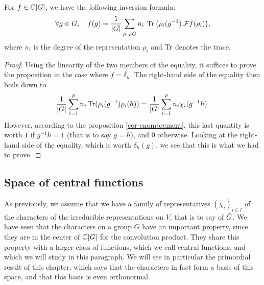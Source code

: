 \begin{thm}
\label{thm-formula-inversion-representation}
 For $ f \in \mathbb{C} [G] $, we have the following inversion formula:
\begin{equation*}
\forall g \in G, \quad f(g) = \frac{1}{|G|} \sum_{\rho_i \in \hat{G}}{n_i \: \operatorname{Tr} \left(\rho_i (g^{-1}) \: \mathcal{F} f(\rho_i) \right)},
\end{equation*}
where $ n_i $ is the degree of the representation $ \rho_i $ and $ \operatorname{Tr} $ denotes the trace.
\end{thm}
\begin{proof}
Using the linearity of the two members of the equality, it suffices to prove the proposition in the case where $ f = \delta_h $. The right-hand side of the equality then boils down to
\begin{equation*}
\frac{1}{|G|} \sum_{i = 1}^p{n_i \operatorname{Tr} (\rho_i (g^{-1}) \rho_i (h))} = \frac{1}{|G|} \sum_{i = 1}^p{n_i \chi_i (g^{-1} h)}.
\end{equation*}
However, according to the proposition \ref{cor-enombrement}, this last quantity is worth $ 1 $ if $ g^{-1} h = 1 $ (that is to say $ g = h $), and $ 0 $ otherwise. Looking at the right-hand side of the equality, which is worth $ \delta_h (g) $, we see that this is what we had to prove.
\end{proof}
 
\subsection{Space of central functions}
\label{sect2-space-central-functions}
 
 
As previously, we assume that we have a family of representatives $ (\chi_i)_{i \in I} $ of the characters of the irreducible representations on $V$, that is to say of $ \hat{ G} $. We have seen that the characters on a group $G$ have an important property, since they are in the center of $ \mathbb{C} [G] $ for the convolution product. They share this property with a larger class of functions, which we call central functions, and which we will study in this paragraph. We will see in particular the primordial result of this chapter, which says that the characters in fact form a basis of this space, and that this basis is even orthonormal.
 
